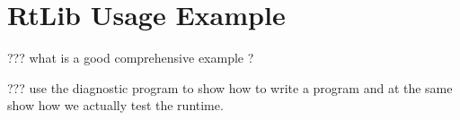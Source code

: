 \chapter{ RtLib Usage Example}

??? what is a good comprehensive example ?

??? use the diagnostic program to show how to write a program and at the same show how we actually test the runtime. 